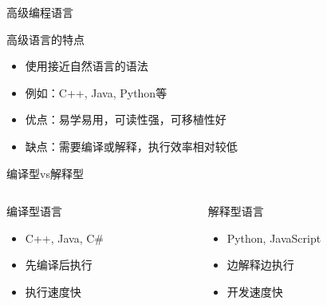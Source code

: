 \documentclass[UTF8,aspectratio=169]{beamer}
\begin{document}
\begin{frame}{高级编程语言}
    \begin{ytublock}{高级语言的特点}
        \begin{itemize}
            \item 使用接近自然语言的语法
            \item 例如：C++, Java, Python等
            \item 优点：易学易用，可读性强，可移植性好
            \item 缺点：需要编译或解释，执行效率相对较低
        \end{itemize}
    \end{ytublock}

    \begin{ytublock}{编译型vs解释型}
        \begin{columns}
            \begin{column}{0.48\textwidth}
                \begin{ytublock}{编译型语言}
                    \begin{itemize}
                        \item C++, Java, C\#
                        \item 先编译后执行
                        \item 执行速度快
                    \end{itemize}
                \end{ytublock}
            \end{column}
            \hspace{0.02\textwidth}
            \begin{column}{0.48\textwidth}
                \begin{ytublock}{解释型语言}
                    \begin{itemize}
                        \item Python, JavaScript
                        \item 边解释边执行
                        \item 开发速度快
                    \end{itemize}
                \end{ytublock}
            \end{column}
        \end{columns}
    \end{ytublock}
\end{frame}
\end{document}
